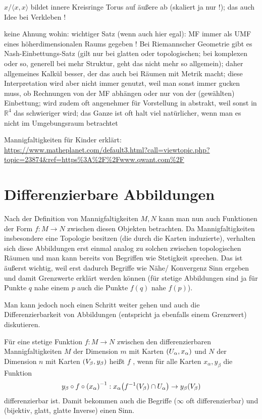 \documentclass[../H_Analysis_main.tex]{subfiles}
\begin{document}
$x/\langle x, x \rangle$ bildet innere Kreisringe Torus auf äußere ab (skaliert ja nur !); das auch Idee bei Verkleben !


keine Ahnung wohin: wichtiger Satz (wenn auch hier egal): MF immer als UMF eines höherdimensionalen Raums gegeben ! Bei Riemannscher Geometrie gibt es Nash-Einbettungs-Satz (gilt nur bei glatten oder topologischen; bei komplexen oder so, generell bei mehr Struktur, geht das nicht mehr so allgemein); daher allgemeines Kalkül besser, der das auch bei Räumen mit Metrik macht; diese Interpretation wird aber nicht immer genutzt, weil man sonst immer gucken muss, ob Rechnungen von der MF abhängen oder nur von der (gewählten) Einbettung; wird zudem oft angenehmer für Vorstellung in abstrakt, weil sonst in $\mathbb{R}^4$ das schwieriger wird; das Ganze ist oft halt viel natürlicher, wenn man es nicht im Umgebungsraum betrachtet




Mannigfaltigkeiten für Kinder erklärt: \url{https://www.matheplanet.com/default3.html?call=viewtopic.php?topic=23874\&ref=https\%3A\%2F\%2Fwww.qwant.com\%2F}


\newpage


	\section{Differenzierbare Abbildungen}
Nach der Definition von Mannigfaltigkeiten $M, N$ kann man nun auch Funktionen der Form $f: M \rightarrow N$ zwischen diesen Objekten betrachten. Da Mannigfaltigkeiten insbesondere eine Topologie besitzen (die durch die Karten induzierte), verhalten sich diese Abbildungen erst einmal analog zu solchen zwischen topologischen Räumen und man kann bereits von Begriffen wie Stetigkeit sprechen. Das ist äußerst wichtig, weil erst dadurch Begriffe wie Nähe/ Konvergenz Sinn ergeben und damit Grenzwerte erklärt werden können (für stetige Abbildungen sind ja für Punkte $q$ nahe einem $p$ auch die Punkte $f(q)$ nahe $f(p)$).

Man kann jedoch noch einen Schritt weiter gehen und auch die Differenzierbarkeit von Abbildungen (entspricht ja ebenfalls einem Grenzwert) diskutieren.


\begin{defi}[Differenzierbarkeit]
Für eine stetige Funktion $f: M \rightarrow N$ zwischen den differenzierbaren Mannigfaltigkeiten $M$ der Dimension $m$ mit Karten $\qty(U_\alpha, x_\alpha)$ und $N$ der Dimension $n$ mit Karten $\qty(V_\beta, y_\beta)$ heißt $f$ , wenn für alle Karten $x_\alpha, y_\beta$ die Funktion
\begin{equation}\label{eq:fktdiffb}
y_\beta \circ f \circ \qty(x_\alpha)^{-1}: x_\alpha\qty(f^{-1}\qty(V_\beta) \cap U_\alpha) \rightarrow y_\beta\qty(V_\beta)
\end{equation}
differenzierbar ist. Damit bekommen auch die Begriffe  ($\infty$ oft differenzierbar) und  (bijektiv, glatt, glatte Inverse) einen Sinn.
\end{defi}
\end{document}
